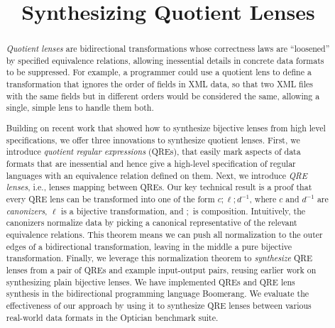 \documentclass[acmsmall,review,anonymous]{acmart}
\begin{document}
\title{Synthesizing Quotient Lenses}
\begin{abstract}
{\em Quotient lenses} are bidirectional transformations whose correctness
laws are ``loosened'' by specified equivalence relations, allowing
inessential details in concrete data formats to be suppressed. 
For example, a programmer could use a quotient lens to define 
a transformation that ignores the order of fields in XML data, so
that two XML files with the same fields but in different orders would be
considered the same, allowing a single, simple lens to handle them both. 

Building on recent work that showed how to synthesize bijective lenses from high
level specifications, we offer three innovations to synthesize quotient lenses.
First, we introduce {\em quotient regular expressions} (QREs), that easily mark
aspects of data formats that are inessential and hence give a high-level
specification of regular languages with an equivalence relation defined on
them. Next, we introduce {\em QRE lenses}, i.e., lenses mapping between QREs.
Our key technical result is a proof that every QRE lens can be transformed into
one of the form $c ; \ell ; d^{-1}$, where $c$ and $d^{-1}$ are {\em
canonizers}, $\ell$ is a bijective transformation, and $;$ is
composition.  Intuitively, the canonizers normalize data by
picking a canonical representative of the relevant equivalence relations. This
theorem means we can push all normalization to the outer edges of a
bidirectional transformation, leaving in the middle a pure bijective
transformation. Finally, we leverage this normalization theorem to {\em
synthesize} QRE lenses from a pair of QREs and example input-output pairs,
reusing earlier work on synthesizing plain bijective lenses. We have
implemented QREs and QRE lens synthesis in the bidirectional programming
language Boomerang. We evaluate the effectiveness of our approach by using it
to synthesize QRE lenses between various real-world data formats in the
Optician benchmark suite.

\end{abstract}

\maketitle
\end{document}
